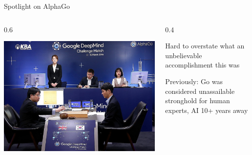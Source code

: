 \documentclass[9pt]{beamer}
\newcommand{\twocolumns}[4]{
\begin{columns}
\begin{column}{#1\textwidth}
    #3
\end{column}
\begin{column}{#2\textwidth}
	#4
\end{column}
\end{columns}
}
\begin{document}
\begin{frame}{Spotlight on AlphaGo}

\twocolumns{0.6}{0.4}{
\includegraphics[width=\textwidth]{p2-alphago}
}{
Hard to overstate what an unbelievable accomplishment this was

\vspace{2em}

Previously: Go was considered unassailable stronghold for human experts, AI 10+ years away
}

\end{frame}
\end{document}
